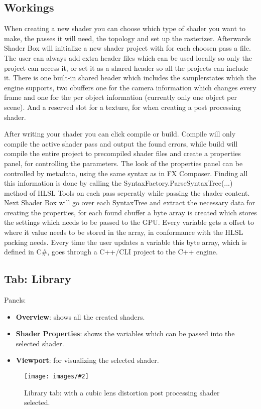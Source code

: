 \documentclass{paper}
\newlength{\imgwidth} %
\newcommand\scalegraphics[3][]
{
	\begin{figure}[H]
	\centering
	\settowidth{\imgwidth}{\texttt{[image: images/\#2]}} %
	\setlength{\imgwidth}{\minof{#1\imgwidth}{\textwidth}} %
	\texttt{[image: images/\#2]} %
	\caption{#3}
	\end{figure}
}
\begin{document}
\subsection{Workings}
When creating a new shader you can choose which type of shader you want to make, the passes it will need, the topology and set up the rasterizer. Afterwards Shader Box will initialize a new shader project with for each choosen pass a file. The user can always add extra header files which can be used locally so only the project can access it, or set it as a shared header so all the projects can include it. There is one built-in shared header which includes the samplerstates which the engine supports, two cbuffers one for the camera information which changes every frame and one for the per object information (currently only one object per scene). And a reserved slot for a texture, for when creating a post processing shader.
\par
After writing your shader you can click compile or build. Compile will only compile the active shader pass and output the found errors, while build will compile the entire project to precompiled shader files and create a properties panel, for controlling the parameters. The look of the properties panel can be controlled by metadata, using the same syntax as in FX Composer. Finding all this information is done by calling the SyntaxFactory.ParseSyntaxTree(...) method of HLSL Tools on each pass seperatly while passing the shader content. Next Shader Box will go over each SyntaxTree and extract the necessary data for creating the properties, for each found cbuffer a byte array is created which stores the settings which needs to be passed to the GPU. Every variable gets a offset to where it value needs to be stored in the array, in conformance with the HLSL packing needs. Every time the user updates a variable this byte array, which is defined in C\#, goes through a C++/CLI project to the C++ engine.

\newpage
\subsection{Tab: Library}\label{subsec:tab_l}
Panels:
\begin{itemize}
	\item \textbf{Overview}: shows all the created shaders.
	\item \textbf{Shader Properties}: shows the variables which can be passed into the selected shader.
	\item \textbf{Viewport}: for visualizing the selected shader.
\end{itemize}
\scalegraphics{Library.png}{Library tab: with a cubic lens distortion post processing shader selected.}
\end{document}
